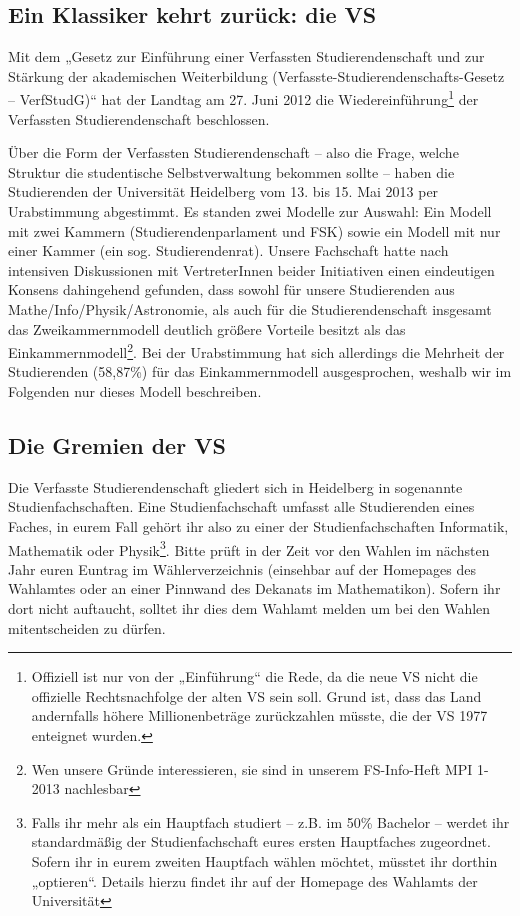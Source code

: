 \subsection{Ein Klassiker kehrt zurück: die VS}

Mit dem „Gesetz zur Einführung einer Verfassten Studierendenschaft und zur
Stärkung der akademischen Weiterbildung
(Ver\-fass\-te-Stu\-dier\-en\-den\-schafts-Ge\-setz -- VerfStudG)“ hat der
Landtag am 27. Juni 2012 die Wiedereinführung\footnote{Offiziell ist nur von
der „Einführung“ die Rede, da die neue VS nicht die offizielle Rechtsnachfolge
der alten VS sein soll.  Grund ist, dass das Land andernfalls höhere
Millionenbeträge zurückzahlen müsste, die der VS 1977 enteignet wurden.} der
Verfassten Studierendenschaft beschlossen.

Über die Form der Verfassten Studierendenschaft -- also die Frage, welche
Struktur die studentische Selbstverwaltung bekommen sollte -- haben die
Studierenden der Universität Heidelberg vom 13. bis 15. Mai 2013 per
Urabstimmung abgestimmt.  Es standen zwei Modelle zur Auswahl: Ein Modell mit
zwei Kammern (Studierendenparlament und FSK) sowie ein Modell mit nur einer
Kammer (ein sog. Studierendenrat). Unsere Fachschaft hatte nach intensiven
Diskussionen mit VertreterInnen beider Initiativen einen eindeutigen Konsens
dahingehend gefunden, dass sowohl für unsere Studierenden aus
Mathe/Info/Physik/Astronomie, als auch für die Studierendenschaft insgesamt das
Zweikammernmodell deutlich größere Vorteile besitzt als das
Einkammernmodell\footnote{Wen unsere Gründe interessieren, sie sind in unserem
FS-Info-Heft MPI 1-2013 nachlesbar}.  Bei der Urabstimmung hat sich allerdings
die Mehrheit der Studierenden (58,87\%) für das Einkammernmodell ausgesprochen,
weshalb wir im Folgenden nur dieses Modell beschreiben.

\subsection{Die Gremien der VS}

Die Verfasste Studierendenschaft gliedert sich in Heidelberg in sogenannte
Studienfachschaften. Eine Studienfachschaft umfasst alle Studierenden eines
Faches, in eurem Fall gehört ihr also zu einer der Studienfachschaften
Informatik, Mathematik oder Physik\footnote{Falls ihr mehr als ein Hauptfach
studiert -- z.B. im 50\% Bachelor -- werdet ihr standardmäßig der
Studienfachschaft eures ersten Hauptfaches zugeordnet.  Sofern ihr in eurem
zweiten Hauptfach wählen möchtet, müsstet ihr dorthin „optieren“.  Details
hierzu findet ihr auf der Homepage des Wahlamts der Universität}.  Bitte prüft
in der Zeit vor den Wahlen im nächsten Jahr euren Euntrag im Wählerverzeichnis
(einsehbar auf der Homepages des Wahlamtes oder an einer Pinnwand des Dekanats
im Mathematikon). Sofern ihr dort nicht auftaucht, solltet ihr dies dem Wahlamt
melden um bei den Wahlen mitentscheiden zu dürfen.

